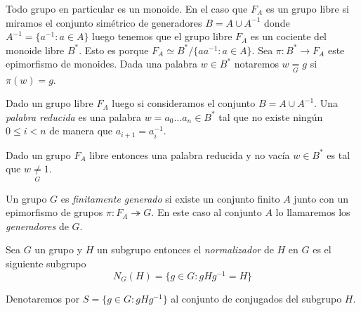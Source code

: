 \documentclass[tesis.tex]{subfiles}
\begin{document}
Todo grupo en particular es un monoide.
En el caso que $F_{A}$ es un grupo libre si miramos el conjunto simétrico de generadores $B = A \cup A^{-1}$ donde $A^{-1} = \{ a^{-1} : a \in A \}$ luego tenemos que el grupo libre $F_{A}$ es un cociente del monoide libre $B^*$.
Esto es porque $F_{A} \simeq B^{*} / \{ aa^{-1} : a \in A \}$.
Sea $\pi: B^{*} \to F_{A}$ este epimorfismo de monoides.
Dada una palabra $w \in B^{*}$ notaremos $w \underset{G}{=} g$ si $\pi(w) = g$.
	

	

\begin{deff}
	Dado un grupo libre $F_{A}$ luego si consideramos el conjunto $B = A \cup A^{-1}$. 
	Una \emph{palabra reducida} es una palabra $w = a_{0} \dots a_{n} \in B^{*}$ tal que no existe ningún $0 \le i < n$ de manera que $a_{i+1}=a_{i}^{-1}$.
\end{deff}


\begin{obs}\label{obs_libres_pal_red}
	Dado un grupo $F_{A}$ libre entonces una palabra reducida y no vacía $w \in B^*$  es tal que $w \underset{G}{\neq} 1$.
\end{obs}


\begin{deff}
	Un grupo $G$ es \emph{finitamente generado} si existe un conjunto finito $A$ junto con un epimorfismo de grupos $\pi: F_{A} \twoheadrightarrow G$.
	En este caso al conjunto $A$ lo llamaremos los \emph{generadores} de $G$.
\end{deff}


\begin{deff}
	Sea $G$ un grupo y $H$ un subgrupo entonces el \emph{normalizador} de $H$ en $G$ es el siguiente subgrupo
	\begin{equation*}
		N_G(H) = \{ g\in G : gHg^{-1} = H  \}
	\end{equation*}
\end{deff}

Denotaremos por $S= \{ g \in G :  gHg^{-1} \}$ al conjunto de conjugados del subgrupo $H$. 
\end{document}
